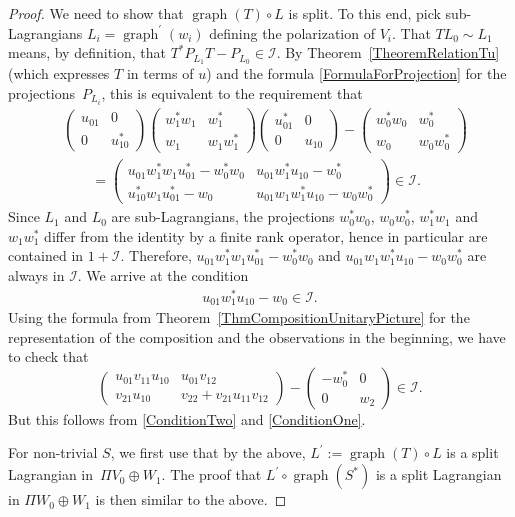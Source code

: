 \documentclass[10pt,a4paper]{amsart}
\numberwithin{equation}{section}
\DeclareMathOperator{\graph}{\mathrm{graph}}
\begin{document}
\begin{proof}
We need to show that $\graph(T) \circ L$ is split.
To this end, pick sub-Lagrangians $L_i = \graph^\prime(w_i)$ defining the polarization of $V_i$.
That $T L_0 \sim L_1$ means, by definition, that $T^*P_{L_1}T - P_{L_0} \in \mathcal{I}$.
By Theorem~\ref{TheoremRelationTu} (which expresses $T$ in terms of $u$) and the formula \eqref{FormulaForProjection} for the projections~$P_{L_i}$, this is equivalent to the requirement that
\begin{align*}
 &\begin{pmatrix} u_{01} & 0 \\ 0 & u_{10}^* \end{pmatrix}
 \begin{pmatrix}w_1^* w_1 & w_1^* \\ w_1 & w_1 w_1^* \end{pmatrix}
 \begin{pmatrix} u_{01}^* & 0 \\ 0 & u_{10} \end{pmatrix}
 -
 \begin{pmatrix}w_0^*w_0 & w_0^* \\ w_0 & w_0 w_0^* \end{pmatrix} \\
 &\qquad=
 \begin{pmatrix} u_{01} w_1^* w_1 u_{01}^* - w_0^* w_0 & u_{01}w_1^*u_{10} - w_0^* \\ u_{10}^*w_1 u_{01}^* - w_0& u_{01} w_1 w_1^* u_{10} - w_0 w_0^* \end{pmatrix} \in \mathcal{I}.
\end{align*}
Since $L_1$ and $L_0$ are sub-Lagrangians, the projections $w_0^* w_0$, $w_0 w_0^*$, $w_1^*w_1$ and $w_1 w_1^*$ differ from the identity by a finite rank operator, hence in particular are contained in $1 + \mathcal{I}$.
Therefore, ${u_{01} w_1^* w_1 u_{01}^* - w_0^* w_0}$ and $u_{01} w_1 w_1^* u_{10} - w_0 w_0^*$ are always in $\mathcal{I}$.
We arrive at the condition
\begin{gather} \label{ConditionOne}
u_{01}w_1^* u_{10} - w_0 \in \mathcal{I}.
\end{gather}
Using the formula from Theorem~\ref{ThmCompositionUnitaryPicture} for the representation of the composition and the observations in the beginning, we have to check that
\begin{equation*}
 \begin{pmatrix} u_{01} v_{11} u_{10} & u_{01} v_{12} \\
 v_{21} u_{10} & v_{22} + v_{21} u_{11}v_{12} \end{pmatrix}
 -
 \begin{pmatrix} -w_0^* & 0 \\
 0& w_2 \end{pmatrix} \in \mathcal{I}.
\end{equation*}
But this follows from \eqref{ConditionTwo} and \eqref{ConditionOne}.

For non-trivial $S$, we first use that by the above, $L^\prime := \graph(T) \circ L$ is a split Lagrangian in~${\Pi V_0 \oplus W_1}$.
The proof that $L^\prime \circ \graph(S^*)$ is a split Lagrangian in $\Pi W_0 \oplus W_1$ is then similar to the above.
\end{proof}
\end{document}

